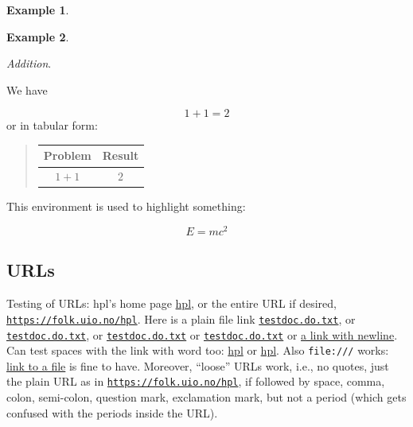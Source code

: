 \n\documentclass[%
oneside,                 %
final,                   %
10pt]{article}
\theoremstyle{definition}
\newtheorem{example}{Example}[section]
\begin{document}
\begin{enumerate}
\begin{example}
\end{example}

\begin{example}
\label{ex:math:1p1}

\noindent\emph{Addition}.

We have

\[ 1 + 1 = 2 \]
or in tabular form:


\begin{quote}
\begin{tabular}{cc}
\hline
\multicolumn{1}{c}{ Problem } & \multicolumn{1}{c}{ Result } \\
\hline
$1+1$   & $2$    \\
\hline
\end{tabular}
\end{quote}

\noindent
\end{example}

\begin{tcolorbox}[%
boxrule=1mm,
coltitle=black,
colframe=blue!45!white,
colback=blue!15!white,
width=(.9\linewidth),before=\hfill,after=\hfill,
adjusted title={Highlight box!}]
This environment is used to highlight something:

\[ E = mc^2 \]
\end{tcolorbox}

\subsection{URLs}
\label{subsubsec:ex}

Testing of URLs: hpl's home page \href{{https://folk.uio.no/hpl}}{hpl}, or
the entire URL if desired, \href{{https://folk.uio.no/hpl}}{\nolinkurl{https://folk.uio.no/hpl}}.  Here is a
plain file link \href{{testdoc.do.txt}}{\nolinkurl{testdoc.do.txt}}, or \href{{testdoc.do.txt}}{\nolinkurl{testdoc.do.txt}}, or
\href{{testdoc.do.txt}}{\nolinkurl{testdoc.do.txt}} or \href{{testdoc.do.txt}}{\nolinkurl{testdoc.do.txt}} or \href{{testdoc.do.txt}}{a link with
newline}. Can test spaces with the link with word
too: \href{{https://folk.uio.no/hpl}}{hpl} or \href{{https://folk.uio.no/hpl}}{hpl}. Also \texttt{file:///} works: \href{{file:///home/hpl/vc/doconce/doc/demos/manual/manual.html}}{link to a
file} is
fine to have. Moreover, ``loose'' URLs work, i.e., no quotes, just
the plain URL as in \href{{https://folk.uio.no/hpl}}{\nolinkurl{https://folk.uio.no/hpl}}, if followed by space, comma,
colon, semi-colon, question mark, exclamation mark, but not a period
(which gets confused with the periods inside the URL).


\end{enumerate}
\end{document}
